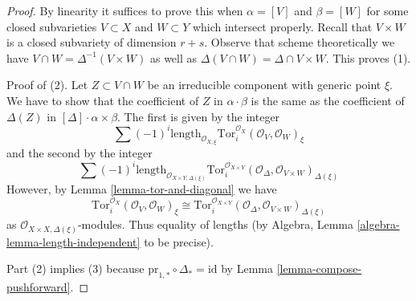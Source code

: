 \documentclass[10pt,a4paper]{amsart}
\theoremstyle{plain}
\theoremstyle{definition}
\theoremstyle{remark}
\numberwithin{equation}{subsection}
\begin{document}
\begin{proof}
By linearity it suffices to prove this when $\alpha = [V]$ and $\beta = [W]$
for some closed subvarieties $V \subset X$ and $W \subset Y$ which intersect
properly. Recall that $V \times W$ is a closed subvariety of dimension $r + s$.
Observe that scheme theoretically we have
$V \cap W = \Delta^{-1}(V \times W)$ as well as
$\Delta(V \cap W) = \Delta \cap V \times W$.
This proves (1).

\medskip\noindent
Proof of (2). Let $Z \subset V \cap W$ be an irreducible component
with generic point $\xi$. We have to show that the coefficient of
$Z$ in $\alpha \cdot \beta$ is the same as the coefficient of
$\Delta(Z)$ in $[\Delta] \cdot \alpha \times \beta$. The first is given
by the integer
$$
\sum (-1)^i
\text{length}_{\mathcal{O}_{X, \xi}}
\text{Tor}_i^{\mathcal{O}_X}(\mathcal{O}_V, \mathcal{O}_W)_\xi
$$
and the second by the integer
$$
\sum (-1)^i
\text{length}_{\mathcal{O}_{X \times Y, \Delta(\xi)}}
\text{Tor}_i^{\mathcal{O}_{X \times Y}}(
\mathcal{O}_\Delta, \mathcal{O}_{V \times W})_{\Delta(\xi)}
$$
However, by Lemma \ref{lemma-tor-and-diagonal} we have
$$
\text{Tor}_i^{\mathcal{O}_X}(\mathcal{O}_V, \mathcal{O}_W)_\xi \cong
\text{Tor}_i^{\mathcal{O}_{X \times Y}}(
\mathcal{O}_\Delta, \mathcal{O}_{V \times W})_{\Delta(\xi)}
$$
as $\mathcal{O}_{X \times X, \Delta(\xi)}$-modules. Thus equality
of lengths (by Algebra, Lemma \ref{algebra-lemma-length-independent}
to be precise).

\medskip\noindent
Part (2) implies (3) because
$\text{pr}_{1, *} \circ \Delta_* = \text{id}$ by
Lemma \ref{lemma-compose-pushforward}.
\end{proof}
\end{document}
